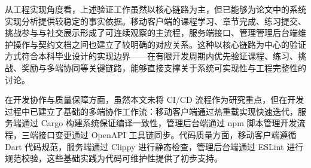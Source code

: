 从工程实现角度看，上述验证工作虽然以核心链路为主，但已能够为论文中的系统实现分析提供较稳定的事实依据。移动客户端的课程学习、章节完成、练习提交、挑战参与与社交展示形成了可连续观察的主流程，服务端接口、管理管理后台端维护操作与契约文档之间也建立了较明确的对应关系。这种以核心链路为中心的验证方式符合本科毕业设计的实现边界——在有限开发周期内优先验证课程、练习、挑战、奖励与多端协同等关键链路，能够直接支撑关于系统可实现性与工程完整性的讨论。

在开发协作与质量保障方面，虽然本文未将 CI/CD 流程作为研究重点，但在开发过程中已建立了基础的多端协作工作流：移动客户端通过热重载实现快速迭代，服务端通过 Cargo 构建系统保证编译一致性，管理后台端通过 npm 脚本管理开发流程，三端接口变更通过 OpenAPI 工具链同步。代码质量方面，移动客户端遵循 Dart 代码规范，服务端通过 Clippy 进行静态检查，管理后台端通过 ESLint 进行规范校验，这些基础实践为代码可维护性提供了初步支持。
